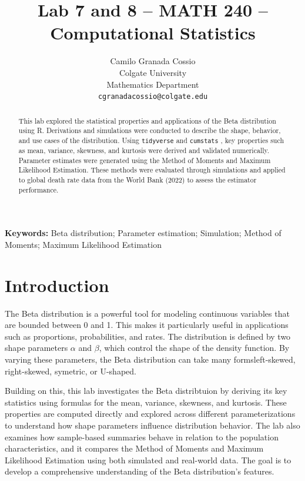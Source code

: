 \documentclass{article}\usepackage[]{graphicx}\usepackage[]{xcolor}
\begin{document}
\vspace{-1in}
\title{Lab 7 and 8 -- MATH 240 -- Computational Statistics}

\author{
  Camilo Granada Cossio \\
  Colgate University  \\
  Mathematics Department  \\
  {\tt cgranadacossio@colgate.edu}
}

\date{}

\maketitle

\begin{multicols}{2}
\begin{abstract}
This lab explored the statistical properties and applications of the Beta distribution using R. Derivations and simulations were conducted to describe the shape, behavior, and use cases of the distribution. Using \texttt{tidyverse} \citep{tidyverse} and \texttt{cumstats} \citep{cumstat}, key properties such as mean, variance, skewness, and kurtosis were derived and validated numerically. Parameter estimates were generated using the Method of Moments and Maximum Likelihood Estimation. These methods were evaluated through simulations and applied to global death rate data from the World Bank (2022) to assess the estimator performance.
\end{abstract}

\noindent \textbf{Keywords:} Beta distribution; Parameter estimation; Simulation; Method of Moments; Maximum Likelihood Estimation

\section{Introduction}

\indent The Beta distribution is a powerful tool for modeling continuous variables that are bounded between 0 and 1. This makes it particularly useful in applications such as proportions, probabilities, and rates. The distribution is defined by two shape parameters $\alpha$ and $\beta$, which control the shape of the density function. By varying these parameters, the Beta distribution can take many forms\textemdash left-skewed, right-skewed, symetric, or U-shaped.

Building on this, this lab investigates the Beta distribtuion by deriving its key statistics using formulas for the mean, variance, skewness, and kurtosis. These properties are computed directly and explored across different parameterizations to understand how shape parameters influence distribution behavior. The lab also examines how sample-based summaries behave in relation to the population characteristics, and it compares the Method of Moments and Maximum Likelihood Estimation using both simulated and real-world data. The goal is to develop a comprehensive understanding of the Beta distribution's features.


\end{multicols}
\end{document}

